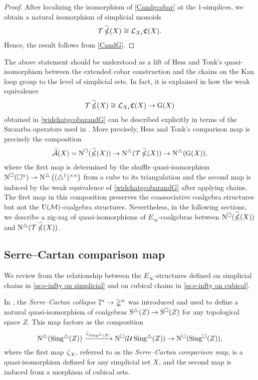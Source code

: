 \begin{proof}
	After localizing the isomorphism of \cref{Candgcobar} at the $1$-simplices, we obtain a natural isomorphism of simplicial monoids
	\[
	\mathcal{T} \operatorname{\widehat{\mathbb{\Omega}}}(X) \cong \operatorname{\mathcal{L}}_{X_1} \! \operatorname{\mathfrak{C}}(X).
	\]
	Hence, the result follows from \cref{CandG}.
\end{proof}

 The above statement should be understood as a lift of Hess and Tonk's quasi-isomorphism between the extended cobar construction and the chains on the Kan loop group to the level of simplicial sets.
In fact, it is explained in \cite{minichello2021path} how the weak equivalence
\[
\mathcal{T} \operatorname{\widehat{\mathbb{\Omega}}}(X) \cong \mathcal{L}_{X_1} \! \operatorname{\mathfrak{C}}(X) \to \operatorname{G}(X)
\]
obtained in \cref{widehatgcobarandG}
 can be described explicitly in terms of the Szczarba operators used in \cite{hess2010cobar}.
More precisely, Hess and Tonk's comparison map is precisely the composition
\[
\operatorname{\mathcal{\widehat{A}}}(X) = \operatorname{N^{\square}}(\operatorname{\widehat{\mathbb{\Omega}}}(X)) \to \operatorname{N^{\triangle}}(\mathcal{T}\operatorname{\widehat{\mathbb{\Omega}}}(X)) \to \operatorname{N^{\triangle}} (\operatorname{G}(X)),
\]
where the first map is determined by the shuffle quasi-isomorphism
$\operatorname{N^{\square}}(\square^n)\to \operatorname{N^{\triangle}} \big( (\triangle^1)^{\times n} \big)$ from a cube to its triangulation and the second map is induced by the weak equivalence of \cref{widehatgcobarandG} after applying chains.
The first map in this composition preserves the coassociative coalgebra structures but not the ${\operatorname{U}(\mathcal{M})}$-coalgebra structures.
Nevertheless, in the following sections, we describe a zig-zag of quasi-isomorphisms of $E_{\infty}$-coalgebras between $\operatorname{N^{\square}}(\operatorname{\widehat{\mathbb{\Omega}}}(X))$ and $\operatorname{N^{\triangle}}(\mathcal{T}\operatorname{\widehat{\mathbb{\Omega}}}(X))$.

\subsection{Serre--Cartan comparison map}

We review from \cite{medina2021cubical} the relationship between the $E_\infty$-structures defined on simplicial chains in \cref{ss:e-infty on simplicial} and on cubical chains in \cref{ss:e-infty on cubical}.

In \cite[p.442]{serre1951homologie}, the \textit{Serre--Cartan collapse} $\mathbb{I}^n \to \mathbb{\Delta}^n$ was introduced and used to define a natural quasi-isomorphism of coalgebras $\operatorname{S^{\triangle}}(Z) \to \operatorname{S^{\square}}(Z)$ for any topological space $Z$.
This map factors as the composition
\[
\operatorname{N^{\triangle}}(\operatorname{Sing^{\triangle}}(Z)) \xrightarrow{\operatorname{\zeta}_{\operatorname{Sing^{\triangle}}(Z)}}
\operatorname{N^{\square}}(\mathcal{U} \operatorname{Sing^{\triangle}}(Z)) \to
\operatorname{N^{\square}}(\operatorname{Sing^{\square}}(Z)),
\]
where the first map $\operatorname{\zeta}_X$, referred to as the \textit{Serre--Cartan comparison map}, is a quasi-isomorphism defined for any simplicial set $X$, and the second map is induced from a morphism of cubical sets.

